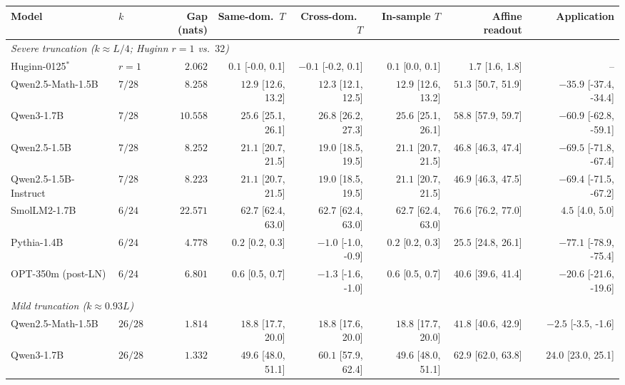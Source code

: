 \begin{table}[t]
\centering
\scriptsize\setlength{\tabcolsep}{3pt}
\begin{tabular}{llrrrrrr}
\toprule
Model & $k$ & Gap (nats) & Same-dom.\ $T$ & Cross-dom.\ $T$ & In-sample $T$ & Affine readout & Application \\
\midrule
\multicolumn{8}{l}{\emph{Severe truncation ($k \approx L/4$; Huginn $r = 1$ vs.\ $32$)}} \\
Huginn-0125$^{\ast}$ & $r=1$ & $2.062$ & $0.1$ {\tiny[-0.0, 0.1]} & $-0.1$ {\tiny[-0.2, 0.1]} & $0.1$ {\tiny[0.0, 0.1]} & $1.7$ {\tiny[1.6, 1.8]} & -- \\
Qwen2.5-Math-1.5B & $7/28$ & $8.258$ & $12.9$ {\tiny[12.6, 13.2]} & $12.3$ {\tiny[12.1, 12.5]} & $12.9$ {\tiny[12.6, 13.2]} & $51.3$ {\tiny[50.7, 51.9]} & $-35.9$ {\tiny[-37.4, -34.4]} \\
Qwen3-1.7B & $7/28$ & $10.558$ & $25.6$ {\tiny[25.1, 26.1]} & $26.8$ {\tiny[26.2, 27.3]} & $25.6$ {\tiny[25.1, 26.1]} & $58.8$ {\tiny[57.9, 59.7]} & $-60.9$ {\tiny[-62.8, -59.1]} \\
Qwen2.5-1.5B & $7/28$ & $8.252$ & $21.1$ {\tiny[20.7, 21.5]} & $19.0$ {\tiny[18.5, 19.5]} & $21.1$ {\tiny[20.7, 21.5]} & $46.8$ {\tiny[46.3, 47.4]} & $-69.5$ {\tiny[-71.8, -67.4]} \\
Qwen2.5-1.5B-Instruct & $7/28$ & $8.223$ & $21.1$ {\tiny[20.7, 21.5]} & $19.0$ {\tiny[18.5, 19.5]} & $21.1$ {\tiny[20.7, 21.5]} & $46.9$ {\tiny[46.3, 47.5]} & $-69.4$ {\tiny[-71.5, -67.2]} \\
SmolLM2-1.7B & $6/24$ & $22.571$ & $62.7$ {\tiny[62.4, 63.0]} & $62.7$ {\tiny[62.4, 63.0]} & $62.7$ {\tiny[62.4, 63.0]} & $76.6$ {\tiny[76.2, 77.0]} & $4.5$ {\tiny[4.0, 5.0]} \\
Pythia-1.4B & $6/24$ & $4.778$ & $0.2$ {\tiny[0.2, 0.3]} & $-1.0$ {\tiny[-1.0, -0.9]} & $0.2$ {\tiny[0.2, 0.3]} & $25.5$ {\tiny[24.8, 26.1]} & $-77.1$ {\tiny[-78.9, -75.4]} \\
OPT-350m (post-LN) & $6/24$ & $6.801$ & $0.6$ {\tiny[0.5, 0.7]} & $-1.3$ {\tiny[-1.6, -1.0]} & $0.6$ {\tiny[0.5, 0.7]} & $40.6$ {\tiny[39.6, 41.4]} & $-20.6$ {\tiny[-21.6, -19.6]} \\
\midrule
\multicolumn{8}{l}{\emph{Mild truncation ($k \approx 0.93L$)}} \\
Qwen2.5-Math-1.5B & $26/28$ & $1.814$ & $18.8$ {\tiny[17.7, 20.0]} & $18.8$ {\tiny[17.6, 20.0]} & $18.8$ {\tiny[17.7, 20.0]} & $41.8$ {\tiny[40.6, 42.9]} & $-2.5$ {\tiny[-3.5, -1.6]} \\
Qwen3-1.7B & $26/28$ & $1.332$ & $49.6$ {\tiny[48.0, 51.1]} & $60.1$ {\tiny[57.9, 62.4]} & $49.6$ {\tiny[48.0, 51.1]} & $62.9$ {\tiny[62.0, 63.8]} & $24.0$ {\tiny[23.0, 25.1]} \\

\end{tabular}
\end{table}
